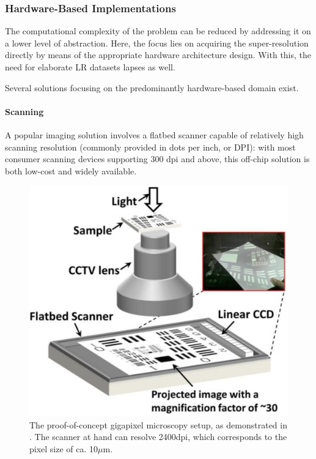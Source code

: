 \subsubsection{Hardware-Based Implementations} 

The computational complexity of the problem can be reduced by addressing it on a lower level of abstraction. Here, the focus lies on acquiring the super-resolution directly by means of the appropriate hardware architecture design. With this, the need for elaborate LR datasets lapses as well. 

Several solutions focusing on the predominantly hardware-based domain exist. %
 
\paragraph{Scanning}

A popular imaging solution involves a flatbed scanner capable of relatively high scanning resolution (commonly provided in dots per inch, or DPI): with most consumer scanning devices supporting 300 dpi and above, this off-chip solution is both low-cost and widely available. 
 \begin{figure}[h]
  \centering
  \includegraphics[width=0.7\linewidth]{imgs/gigascan.png}
  \caption{The proof-of-concept gigapixel microscopy setup, as demonstrated in \cite{zheng20140}. The scanner at hand can resolve 2400dpi, which corresponds to the pixel size of ca. 10$\mu$m.}
  \label{fig:gigamicro}
\end{figure}

